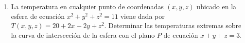 \documentclass[a4,11pt]{aleph-examen}
\begin{document}
\begin{preguntas}
\begin{respuesta}
\begin{respuesta}
\begin{respuesta}
\begin{enumerate}
\item
    La temperatura en cualquier punto de coordenadas $(x,y,z)$ ubicado en la esfera de ecuación $x^2+y^2+z^2=11$ viene dada por $T(x,y,z)=20 + 2x +2y + z^2$. Determinar las temperaturas extremas sobre la curva de intersección de la esfera con el plano $P$ de ecuación $x+y+z=3$.
    



\end{enumerate}
\end{respuesta}
\end{respuesta}
\end{respuesta}
\end{preguntas}
\end{document}
